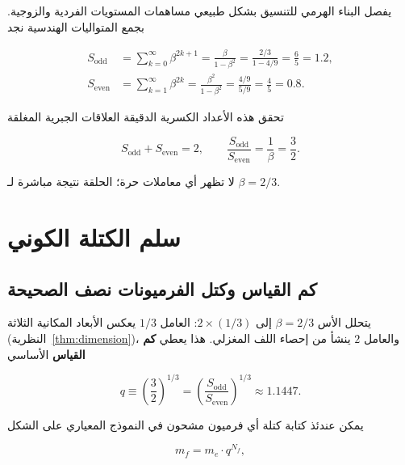 \documentclass[11pt,a4paper]{article}
\begin{document}
	يفصل البناء الهرمي للتنسيق بشكل طبيعي مساهمات المستويات الفردية والزوجية. بجمع المتواليات الهندسية نجد
	
	\begin{align}
		S_{\mathrm{odd}} &= \sum_{k=0}^{\infty} \beta^{2k+1} = \frac{\beta}{1-\beta^{2}}
		= \frac{2/3}{1 - 4/9} = \frac{6}{5} = 1.2, \label{eq:sodd}\\
		S_{\mathrm{even}} &= \sum_{k=1}^{\infty} \beta^{2k} = \frac{\beta^{2}}{1-\beta^{2}}
		= \frac{4/9}{5/9} = \frac{4}{5} = 0.8. \label{eq:seven}
	\end{align}
	
	تحقق هذه الأعداد الكسرية الدقيقة العلاقات الجبرية المغلقة
	
	\begin{equation}
		\boxed{S_{\mathrm{odd}} + S_{\mathrm{even}} = 2, \qquad
			\frac{S_{\mathrm{odd}}}{S_{\mathrm{even}}} = \frac{1}{\beta} = \frac{3}{2}}.
		\label{eq:algebraic-loop}
	\end{equation}
	
	لا تظهر أي معاملات حرة؛ الحلقة نتيجة مباشرة لـ \(\beta = 2/3\).
	
	\section{سلم الكتلة الكوني}
	\label{sec:mass-ladder}
	
	\subsection{كم القياس وكتل الفرميونات نصف الصحيحة}
	
	يتحلل الأس \(\beta = 2/3\) إلى \(2 \times (1/3)\): العامل \(1/3\) يعكس الأبعاد المكانية الثلاثة (النظرية~\ref{thm:dimension})، والعامل \(2\) ينشأ من إحصاء اللف المغزلي. هذا يعطي \textbf{كم القياس} الأساسي
	
	\begin{equation}
		q \equiv \left(\frac{3}{2}\right)^{1/3}
		= \left(\frac{S_{\mathrm{odd}}}{S_{\mathrm{even}}}\right)^{1/3} \approx 1.1447.
	\end{equation}
	
	يمكن عندئذ كتابة كتلة أي فرميون مشحون في النموذج المعياري على الشكل
	
	\begin{equation}
		\boxed{m_f = m_e \cdot q^{N_f}},
		\label{eq:mass-quantization}
	\end{equation}
	
\end{document}
